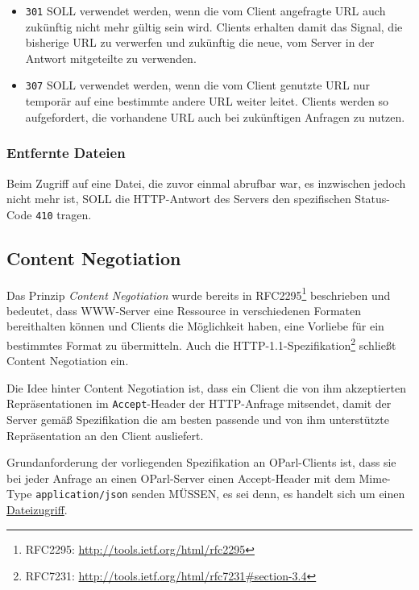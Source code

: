\documentclass[,a4paper]{article}
\begin{document}
\begin{itemize}
\item
  \texttt{301} SOLL verwendet werden, wenn die vom Client angefragte URL
  auch zukünftig nicht mehr gültig sein wird. Clients erhalten damit das
  Signal, die bisherige URL zu verwerfen und zukünftig die neue, vom
  Server in der Antwort mitgeteilte zu verwenden.
\item
  \texttt{307} SOLL verwendet werden, wenn die vom Client genutzte URL
  nur temporär auf eine bestimmte andere URL weiter leitet. Clients
  werden so aufgefordert, die vorhandene URL auch bei zukünftigen
  Anfragen zu nutzen.
\end{itemize}

\subsubsection{Entfernte Dateien}\label{entfernte-dateien}

Beim Zugriff auf eine Datei, die zuvor einmal abrufbar war, es
inzwischen jedoch nicht mehr ist, SOLL die HTTP-Antwort des Servers den
spezifischen Status-Code \texttt{410} tragen.

\subsection{Content Negotiation}\label{contentux5fnegotiation}

Das Prinzip \emph{Content Negotiation} wurde bereits in
RFC2295\footnote{RFC2295: \url{http://tools.ietf.org/html/rfc2295}}
beschrieben und bedeutet, dass WWW-Server eine Ressource in
verschiedenen Formaten bereithalten können und Clients die Möglichkeit
haben, eine Vorliebe für ein bestimmtes Format zu übermitteln. Auch die
HTTP-1.1-Spezifikation\footnote{RFC7231:
  \url{http://tools.ietf.org/html/rfc7231\#section-3.4}} schließt
Content Negotiation ein.

Die Idee hinter Content Negotiation ist, dass ein Client die von ihm
akzeptierten Repräsentationen im \texttt{Accept}-Header der HTTP-Anfrage
mitsendet, damit der Server gemäß Spezifikation die am besten passende
und von ihm unterstützte Repräsentation an den Client ausliefert.

Grundanforderung der vorliegenden Spezifikation an OParl-Clients ist,
dass sie bei jeder Anfrage an einen OParl-Server einen Accept-Header mit
dem Mime-Type \texttt{application/json} senden MÜSSEN, es sei denn, es
handelt sich um einen \hyperref[dateizugriff]{Dateizugriff}.
\end{document}

